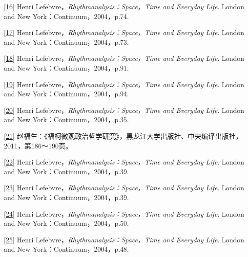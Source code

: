 \documentclass[UTF8, fontset = sourcesans, a4paper, oneside, zihao =
-4, scheme=chinese, no-math, space=true]{ctexbook}
\begin{document}
\protect\hypertarget{part0009_split_004.htmlux5cux23m16}{}{}\protect\hyperlink{part0009_split_002.htmlux5cux23w16}{{[}16{]}}
Henri Lefebvre，\emph{Rhythmanalysis：Space，Time and Everyday Life}.
London and New York：Continuum，2004，p.74.

\protect\hypertarget{part0009_split_004.htmlux5cux23m17}{}{}\protect\hyperlink{part0009_split_002.htmlux5cux23w17}{{[}17{]}}
Henri Lefebvre，\emph{Rhythmanalysis：Space，Time and Everyday Life}.
London and New York：Continuum，2004，p.73.

\protect\hypertarget{part0009_split_004.htmlux5cux23m18}{}{}\protect\hyperlink{part0009_split_002.htmlux5cux23w18}{{[}18{]}}
Henri Lefebvre，\emph{Rhythmanalysis：Space，Time and Everyday Life}.
London and New York：Continuum，2004，p.91.

\protect\hypertarget{part0009_split_004.htmlux5cux23m19}{}{}\protect\hyperlink{part0009_split_002.htmlux5cux23w19}{{[}19{]}}
Henri Lefebvre，\emph{Rhythmanalysis：Space，Time and Everyday Life}.
London and New York：Continuum，2004，p.94.

\protect\hypertarget{part0009_split_004.htmlux5cux23m20}{}{}\protect\hyperlink{part0009_split_002.htmlux5cux23w20}{{[}20{]}}
Henri Lefebvre，\emph{Rhythmanalysis：Space，Time and Everyday Life}.
London and New York：Continuum，2004，p.35.

\protect\hypertarget{part0009_split_004.htmlux5cux23m21}{}{}\protect\hyperlink{part0009_split_003.htmlux5cux23w21}{{[}21{]}}
赵福生：《福柯微观政治哲学研究》，黑龙江大学出版社、中央编译出版社，2011，第186～190页。

\protect\hypertarget{part0009_split_004.htmlux5cux23m22}{}{}\protect\hyperlink{part0009_split_003.htmlux5cux23w22}{{[}22{]}}
Henri Lefebvre，\emph{Rhythmanalysis：Space，Time and Everyday Life}.
London and New York：Continuum，2004，p.39.

\protect\hypertarget{part0009_split_004.htmlux5cux23m23}{}{}\protect\hyperlink{part0009_split_003.htmlux5cux23w23}{{[}23{]}}
Henri Lefebvre，\emph{Rhythmanalysis：Space，Time and Everyday Life}.
London and New York：Continuum，2004，p.39.

\protect\hypertarget{part0009_split_004.htmlux5cux23m24}{}{}\protect\hyperlink{part0009_split_003.htmlux5cux23w24}{{[}24{]}}
Henri Lefebvre，\emph{Rhythmanalysis：Space，Time and Everyday Life}.
London and New York：Continuum，2004，p.50.

\protect\hypertarget{part0009_split_004.htmlux5cux23m25}{}{}\protect\hyperlink{part0009_split_003.htmlux5cux23w25}{{[}25{]}}
Henri Lefebvre，\emph{Rhythmanalysis：Space，Time and Everyday Life}.
London and New York：Continuum，2004，p.48.
\end{document}
